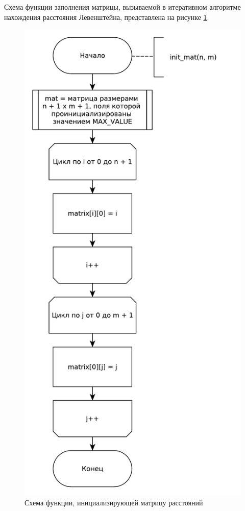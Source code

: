 \documentclass[a4paper,oneside,14pt]{extreport}
\begin{document}
Схема функции заполнения матрицы, вызываемой в итеративном алгоритме нахождения расстояния Левенштейна, представлена на рисунке \ref{fig:init_mat}.
\begin{figure}[H]
	\centering
	\includegraphics[width=0.59\linewidth]{images/init_mat}
	\caption{Схема функции, инициализирующей матрицу расстояний}
	\label{fig:init_mat}
\end{figure}
\end{document}
